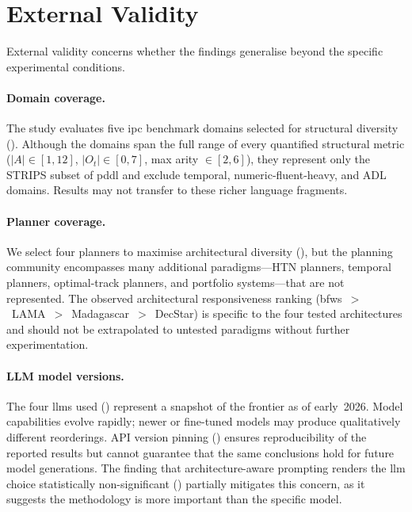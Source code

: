 \section{External Validity}
\label{sec:threats:external}

External validity concerns whether the findings generalise beyond the specific experimental conditions.

\paragraph{Domain coverage.}
The study evaluates five \gls{ipc} benchmark domains selected for structural diversity ().
Although the domains span the full range of every quantified structural metric ($\lvert A \rvert \in [1,12]$, $\lvert O_t \rvert \in [0,7]$, max arity $\in [2,6]$), they represent only the STRIPS subset of \gls{pddl} and exclude temporal, numeric-fluent-heavy, and ADL domains.
Results may not transfer to these richer language fragments.

\paragraph{Planner coverage.}
We select four planners to maximise architectural diversity (), but the planning community encompasses many additional paradigms---HTN planners, temporal planners, optimal-track planners, and portfolio systems---that are not represented.
The observed architectural responsiveness ranking (\gls{bfws}~$>$~LAMA~$>$~Madagascar~$>$~DecStar) is specific to the four tested architectures and should not be extrapolated to untested paradigms without further experimentation.

\paragraph{LLM model versions.}
The four \glspl{llm} used () represent a snapshot of the frontier as of early~2026.
Model capabilities evolve rapidly; newer or fine-tuned models may produce qualitatively different reorderings.
API version pinning () ensures reproducibility of the reported results but cannot guarantee that the same conclusions hold for future model generations.
The finding that architecture-aware prompting renders the \gls{llm} choice statistically non-significant () partially mitigates this concern, as it suggests the methodology is more important than the specific model.

